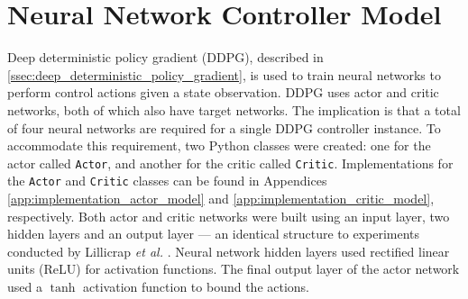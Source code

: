 \section{Neural Network Controller Model}

Deep deterministic policy gradient (DDPG), described in \textsection \ref{ssec:deep_deterministic_policy_gradient}, is used to train neural networks to perform control actions given a state observation. DDPG uses actor and critic networks, both of which also have target networks. The implication is that a total of four neural networks are required for a single DDPG controller instance. To accommodate this requirement, two Python classes were created: one for the actor called \verb|Actor|, and another for the critic called \verb|Critic|. Implementations for the \verb|Actor| and \verb|Critic| classes can be found in Appendices \ref{app:implementation_actor_model} and \ref{app:implementation_critic_model}, respectively. Both actor and critic networks were built using an input layer, two hidden layers and an output layer --- an identical structure to experiments conducted by Lillicrap \textit{et al.} \cite{Lillicrap2015}. Neural network hidden layers used rectified linear units (ReLU) for activation functions. The final output layer of the actor network used a $\tanh$ activation function to bound the actions.